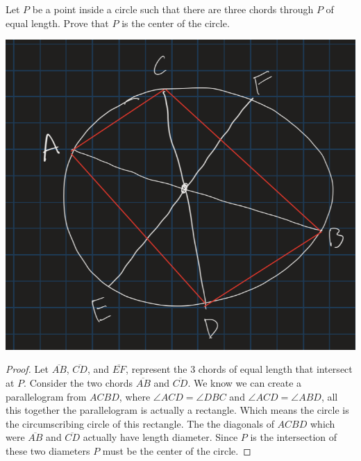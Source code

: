 \documentclass[11pt]{article}
\newenvironment{problem}[2][Problem\!]{\begin{trivlist}
\item[\hskip \labelsep {\bfseries #1}\hskip \labelsep {\bfseries #2}]}{\end{trivlist}}
\begin{document}
\begin{tcolorbox}
    \begin{problem} {OC | 11/15 | 97.}
        Let $P$ be a point inside a circle such that there are three chords through $P$ of equal length. Prove that $P$ is the center of the circle.
    \end{problem}
\end{tcolorbox}
\includegraphics[scale=.5]{prob4}
\begin{proof}
    Let $\overline{AB}$, $\overline{CD}$, and $\overline{EF}$, represent the 3 chords of equal length that intersect at $P$. Consider the two chords $\overline{AB}$ and $\overline{CD}$. We know we can create a parallelogram from $ACBD$, where $\angle ACD = \angle DBC$ and $\angle ACD = \angle ABD$, all this together the parallelogram is actually a rectangle. Which means the circle is the circumscribing circle of this rectangle. The the diagonals of $ACBD$ which were $\overline{AB}$ and $\overline{CD}$ actually have length diameter. Since $P$ is the intersection of these two diameters $P$ must be the center of the circle. 
\end{proof}
\end{document}
